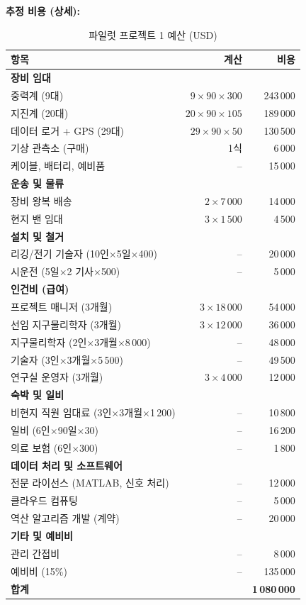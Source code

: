 \documentclass[12pt,a4paper]{article}
\theoremstyle{remark}
\begin{document}
	\textbf{추정 비용 (상세):}
	\begin{table}[htbp]
		\centering
		\caption{파일럿 프로젝트 1 예산 (USD)}
		\label{tab:budget-building}
		\small
		\begin{tabular}{lrr}
			\toprule
			\textbf{항목} & \textbf{계산} & \textbf{비용} \\
			\midrule
			\multicolumn{3}{l}{\textbf{장비 임대}} \\
			중력계 (9대) & $9\times90\times300$ & 243\,000 \\
			지진계 (20대) & $20\times90\times105$ & 189\,000 \\
			데이터 로거 + GPS (29대) & $29\times90\times50$ & 130\,500 \\
			기상 관측소 (구매) & 1식 & 6\,000 \\
			케이블, 배터리, 예비품 & – & 15\,000 \\
			\multicolumn{3}{l}{\textbf{운송 및 물류}} \\
			장비 왕복 배송 & $2\times7\,000$ & 14\,000 \\
			현지 밴 임대 & $3\times1\,500$ & 4\,500 \\
			\multicolumn{3}{l}{\textbf{설치 및 철거}} \\
			리깅/전기 기술자 (10인$\times$5일$\times$400) & – & 20\,000 \\
			시운전 (5일$\times$2 기사$\times$500) & – & 5\,000 \\
			\multicolumn{3}{l}{\textbf{인건비 (급여)}} \\
			프로젝트 매니저 (3개월) & $3\times18\,000$ & 54\,000 \\
			선임 지구물리학자 (3개월) & $3\times12\,000$ & 36\,000 \\
			지구물리학자 (2인$\times$3개월$\times$8\,000) & – & 48\,000 \\
			기술자 (3인$\times$3개월$\times$5\,500) & – & 49\,500 \\
			연구실 운영자 (3개월) & $3\times4\,000$ & 12\,000 \\
			\multicolumn{3}{l}{\textbf{숙박 및 일비}} \\
			비현지 직원 임대료 (3인$\times$3개월$\times$1\,200) & – & 10\,800 \\
			일비 (6인$\times$90일$\times$30) & – & 16\,200 \\
			의료 보험 (6인$\times$300) & – & 1\,800 \\
			\multicolumn{3}{l}{\textbf{데이터 처리 및 소프트웨어}} \\
			전문 라이선스 (MATLAB, 신호 처리) & – & 12\,000 \\
			클라우드 컴퓨팅 & – & 5\,000 \\
			역산 알고리즘 개발 (계약) & – & 20\,000 \\
			\multicolumn{3}{l}{\textbf{기타 및 예비비}} \\
			관리 간접비 & – & 8\,000 \\
			예비비 (15\%) & – & 135\,000 \\
			\midrule
			\textbf{합계} & & \textbf{1\,080\,000} \\
			\bottomrule
		\end{tabular}
	\end{table}
	
\end{document}
